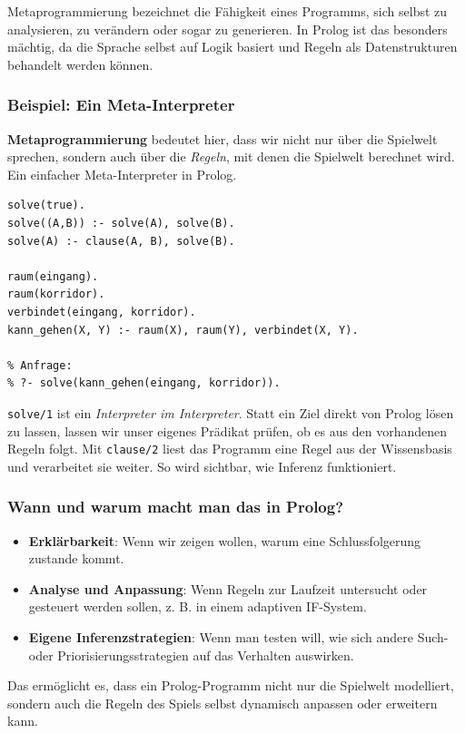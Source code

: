\documentclass[parskip=half,a4paper,11pt]{scrreprt}
\begin{document}
Metaprogrammierung bezeichnet die Fähigkeit eines Programms, sich selbst zu analysieren, zu verändern oder sogar zu generieren. In Prolog ist das besonders mächtig, da die Sprache selbst auf Logik basiert und Regeln als Datenstrukturen behandelt werden können.

\subsubsection{Beispiel: Ein Meta-Interpreter}

\textbf{Metaprogrammierung} bedeutet hier, dass wir nicht nur über die Spielwelt sprechen, sondern auch über die \textit{Regeln}, mit denen die Spielwelt berechnet wird. Ein einfacher Meta-Interpreter in Prolog.
\begin{lstlisting}[caption={}]
solve(true).
solve((A,B)) :- solve(A), solve(B).
solve(A) :- clause(A, B), solve(B).

raum(eingang).
raum(korridor).
verbindet(eingang, korridor).
kann_gehen(X, Y) :- raum(X), raum(Y), verbindet(X, Y).

% Anfrage:
% ?- solve(kann_gehen(eingang, korridor)).
\end{lstlisting}

\texttt{solve/1} ist ein\textit{ Interpreter im Interpreter}. Statt ein Ziel direkt von Prolog lösen zu lassen, lassen wir unser eigenes Prädikat prüfen, ob es aus den vorhandenen Regeln folgt. Mit \texttt{clause/2} liest das Programm eine Regel aus der Wissensbasis und verarbeitet sie weiter. So wird sichtbar, wie Inferenz funktioniert.

\subsubsection{Wann und warum macht man das in Prolog?}

\begin{itemize}
    \item \textbf{Erklärbarkeit}: Wenn wir zeigen wollen, warum eine Schlussfolgerung zustande kommt.
    \item \textbf{Analyse und Anpassung}: Wenn Regeln zur Laufzeit untersucht oder gesteuert werden sollen, z. B. in einem adaptiven IF-System.
    \item \textbf{Eigene Inferenzstrategien}: Wenn man testen will, wie sich andere Such- oder Priorisierungsstrategien auf das Verhalten auswirken.
\end{itemize}

Das ermöglicht es, dass ein Prolog-Programm nicht nur die Spielwelt modelliert, sondern auch die Regeln des Spiels selbst dynamisch anpassen oder erweitern kann.
\end{document}
